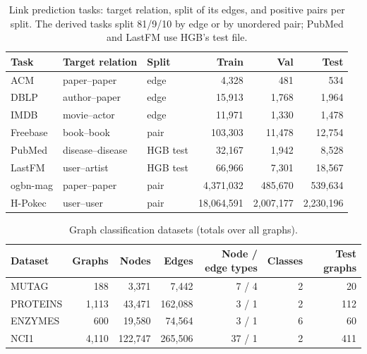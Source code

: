 \documentclass{article}
\begin{document}
\begin{table}[!htbp]
  \centering
  \caption{Link prediction tasks: target relation, split of its edges, and positive pairs per split. The derived tasks split 81/9/10 by edge or by unordered pair; PubMed and LastFM use HGB's test file.}
  \label{tab:app-lp}
  \scriptsize
  \setlength{\tabcolsep}{3pt}
  \begin{tabular}{lllrrr}
    \toprule
    Task & Target relation & Split & Train & Val & Test \\
    \midrule
    ACM & paper--paper & edge & 4{,}328 & 481 & 534 \\
    DBLP & author--paper & edge & 15{,}913 & 1{,}768 & 1{,}964 \\
    IMDB & movie--actor & edge & 11{,}971 & 1{,}330 & 1{,}478 \\
    Freebase & book--book & pair & 103{,}303 & 11{,}478 & 12{,}754 \\
    PubMed & disease--disease & HGB test & 32{,}167 & 1{,}942 & 8{,}528 \\
    LastFM & user--artist & HGB test & 66{,}966 & 7{,}301 & 18{,}567 \\
    ogbn-mag & paper--paper & pair & 4{,}371{,}032 & 485{,}670 & 539{,}634 \\
    H-Pokec & user--user & pair & 18{,}064{,}591 & 2{,}007{,}177 & 2{,}230{,}196 \\
    \bottomrule
  \end{tabular}
\end{table}

\begin{table}[!htbp]
  \centering
  \caption{Graph classification datasets (totals over all graphs).}
  \label{tab:app-gc}
  \scriptsize
  \setlength{\tabcolsep}{3pt}
  \begin{tabular}{lrrrrrr}
    \toprule
    Dataset & Graphs & Nodes & Edges & Node / edge types & Classes & Test graphs \\
    \midrule
    MUTAG & 188 & 3{,}371 & 7{,}442 & 7 / 4 & 2 & 20 \\
    PROTEINS & 1{,}113 & 43{,}471 & 162{,}088 & 3 / 1 & 2 & 112 \\
    ENZYMES & 600 & 19{,}580 & 74{,}564 & 3 / 1 & 6 & 60 \\
    NCI1 & 4{,}110 & 122{,}747 & 265{,}506 & 37 / 1 & 2 & 411 \\
    \bottomrule
  \end{tabular}
\end{table}
\end{document}
